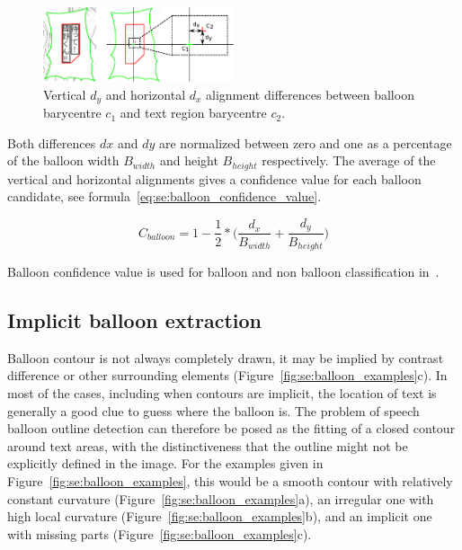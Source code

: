 	\begin{figure}[h!]	%
	  \centering
		\includegraphics[trim= 140px 0px 0px 0px, clip, width=0.5\textwidth]{text_balloon_alignment.pdf}
		\caption[Illustration of the vertical and horizontal alignment differences between balloon and text region barycentre]{Vertical $d_y$ and horizontal $d_x$ alignment differences between balloon barycentre $c_1$ and text region barycentre $c_2$.}
		\label{fig:se:align_diff}
	\end{figure}

Both differences $dx$ and $dy$ are normalized between zero and one as a percentage of the balloon width $B_{width}$ and height $B_{height}$ respectively.
The average of the vertical and horizontal alignments gives a confidence value for each balloon candidate, see formula~\ref{eq:se:balloon_confidence_value}.


\begin{equation}
	\label{eq:se:balloon_confidence_value}
	C_{balloon} = 1 - \frac{1}{2} *  \bigg( \frac{d_x}{B_{width}} + \frac{d_y}{B_{height}} \bigg)
\end{equation}

Balloon confidence value is used for balloon and non balloon classification in~.




\subsection{Implicit balloon extraction} %
\label{sub:implicit_balloon_extraction}

Balloon contour is not always completely drawn, it may be implied by contrast difference or other surrounding elements (Figure~\ref{fig:se:balloon_examples}c).
In most of the cases, including when contours are implicit, the location of text is generally a good clue to guess where the balloon is.
The problem of speech balloon outline detection can therefore be posed as the fitting of a closed contour around text areas, with the distinctiveness that the outline might not be explicitly defined in the image.
For the examples given in Figure~\ref{fig:se:balloon_examples}, this would be a smooth contour with relatively constant curvature (Figure~\ref{fig:se:balloon_examples}a), an irregular one with high local curvature (Figure~\ref{fig:se:balloon_examples}b), and an implicit one with missing parts (Figure~\ref{fig:se:balloon_examples}c).

